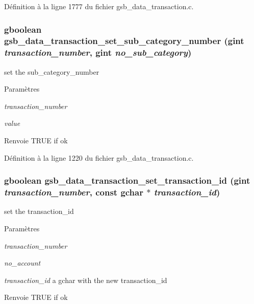 Définition à la ligne 1777 du fichier gsb\_\-data\_\-transaction.c.

\subsubsection[{gsb\_\-data\_\-transaction\_\-set\_\-sub\_\-category\_\-number}]{\setlength{\rightskip}{0pt plus 5cm}gboolean gsb\_\-data\_\-transaction\_\-set\_\-sub\_\-category\_\-number (gint {\em transaction\_\-number}, \/  gint {\em no\_\-sub\_\-category})}\label{gsb__data__transaction_8c_a0a63ca7e6d34a226c6f0b8b339fbf518}
set the sub\_\-category\_\-number


\begin{DoxyParams}{Paramètres}
\item[{\em transaction\_\-number}]\item[{\em value}]\end{DoxyParams}
\begin{DoxyReturn}{Renvoie}
TRUE if ok 
\end{DoxyReturn}


Définition à la ligne 1220 du fichier gsb\_\-data\_\-transaction.c.

\subsubsection[{gsb\_\-data\_\-transaction\_\-set\_\-transaction\_\-id}]{\setlength{\rightskip}{0pt plus 5cm}gboolean gsb\_\-data\_\-transaction\_\-set\_\-transaction\_\-id (gint {\em transaction\_\-number}, \/  const gchar $\ast$ {\em transaction\_\-id})}\label{gsb__data__transaction_8c_aaafdf25dfa0a28d07716500082f6c35c}
set the transaction\_\-id 
\begin{DoxyParams}{Paramètres}
\item[{\em transaction\_\-number}]\item[{\em no\_\-account}]\item[{\em transaction\_\-id}]a gchar with the new transaction\_\-id \end{DoxyParams}
\begin{DoxyReturn}{Renvoie}
TRUE if ok 
\end{DoxyReturn}


